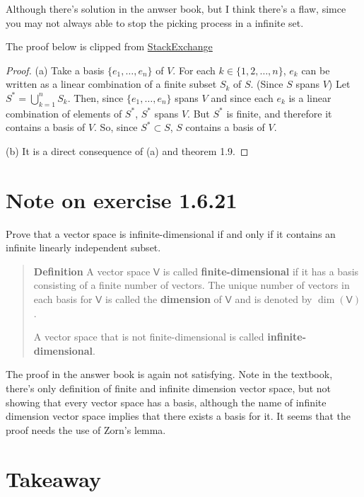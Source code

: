 \documentclass{article}
\newcommand{\0}{\mathit{0}}
\begin{document}
Although there's solution in the anwser book, but I think there's a flaw, simce you
may not always able to stop the picking process in a infinite set.

The proof below is clipped from \href{https://math.stackexchange.com/a/4762926/808819}{StackExchange}

\begin{proof}
    (a)
    Take a basis  $\{e_1,\ldots,e_n\}$ of $V$.
    For each $k\in\{1,2,\ldots,n\}$, $e_k$ can be written as a linear
    combination of a finite subset $S_k$ of $S$. (Since $S$ spans $V$)
    Let $S^\ast=\bigcup_{k=1}^nS_k$.
    Then, since $\{e_1,\ldots,e_n\}$ spans $V$ and
    since each $e_k$ is a linear combination of elements of $S^\ast$,
    $S^\ast$ spans $V$. But $S^\ast$ is finite, and therefore it contains a basis of $V$.
    So, since $S^\ast\subset S$, $S$ contains a basis of $V$.

    (b) It is a direct consequence of (a) and theorem 1.9.
\end{proof}

\section{Note on exercise 1.6.21}
Prove that a vector space is infinite-dimensional if and only if it contains
an infinite linearly independent subset.

\begin{quotation}
    \textbf{Definition}
    A vector space $\mathsf{V}$ is called \textbf{finite-dimensional} if it has a basis
    consisting of a finite number of vectors. The unique number of vectors in each
    basis for $\mathsf{V}$ is called the \textbf{dimension} of $\mathsf{V}$ and is denoted
    by $\dim(\mathsf{V})$.

    A vector space that is not finite-dimensional is called \textbf{infinite-dimensional}.
\end{quotation}

The proof in the answer book is again not satisfying. Note in the textbook, there's only
definition of finite and infinite dimension vector space, but not showing that every vector
space has a basis, although the name of infinite dimension vector space implies that
there exists a basis for it. It seems that the proof needs the use of Zorn's lemma.


\section{Takeaway}
\end{document}

